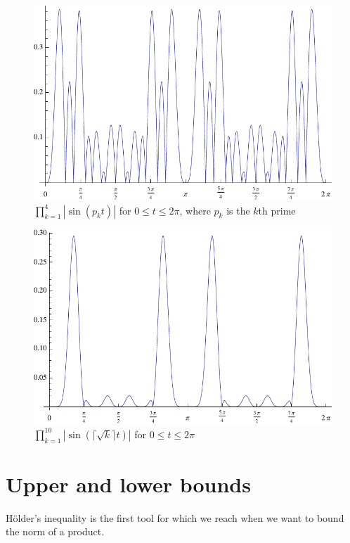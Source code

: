 \documentclass{article}
\begin{document}
\begin{center}
\begin{figure}
\includegraphics[scale=0.95]{prime4}
\caption{$\prod_{k=1}^4 |\sin(p_k t)|$ for $0 \leq t \leq 2\pi$, where $p_k$ is the $k$th prime}
\label{prime4}
\end{figure}
\end{center}

\begin{center}
\begin{figure}
\includegraphics[scale=0.95]{sqrt10}
\caption{$\prod_{k=1}^{10} |\sin(\lceil \sqrt{k} \rceil t)|$ for $0 \leq t \leq 2\pi$}
\label{sqrt10}
\end{figure}
\end{center}



\section{Upper and lower bounds}
\label{bounds}
H\"older's inequality is the first tool for which we reach when we want to bound the norm of a product.
\end{document}
